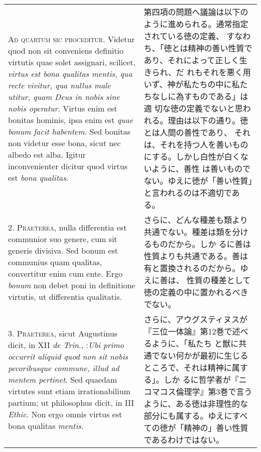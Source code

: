 \documentclass[10pt]{jsarticle}
\begin{document}
\begin{longtable}{p{21em}p{21em}}
{\scshape Ad quartum sic proceditur}. Videtur quod non sit conveniens
definitio virtutis quae solet assignari, scilicet, {\itshape virtus
est bona qualitas mentis, qua recte vivitur, qua nullus male utitur,
quam Deus in nobis sine nobis operatur}. Virtus enim est bonitas
hominis, ipsa enim est {\itshape quae bonum facit habentem}. Sed
bonitas non videtur esse bona, sicut nec albedo est alba. Igitur
inconvenienter dicitur quod virtus est {\itshape bona qualitas}.

&

第四項の問題へ議論は以下のように進められる。通常指定されている徳の定義、
すなわち、「徳とは精神の善い性質であり、それによって正しく生きられ、だ
れもそれを悪く用いず、神が私たちの中に私たちなしに為すものである」は適
切な徳の定義でないと思われる。理由は以下の通り。徳とは人間の善性であり、
それは、それを持つ人を善いものにする。しかし白性が白くないように、善性
は善いものでない。ゆえに徳が「善い性質」と言われるのは不適切である。

\\

2. {\scshape Praeterea}, nulla differentia est communior suo genere,
cum sit generis divisiva. Sed bonum est communius quam qualitas,
convertitur enim cum ente. Ergo {\itshape bonum} non debet poni in
definitione virtutis, ut differentia qualitatis.

&

さらに、どんな種差も類より共通でない。種差は類を分けるものだから。しか
るに善は性質よりも共通である。善は有と置換されるのだから。ゆえに善は、
性質の種差として徳の定義の中に置かれるべきでない。

\\

3. {\scshape Praeterea}, sicut Augustinus dicit, in XII {\itshape de
Trin}., :{\itshape Ubi primo occurrit aliquid quod non sit nobis
pecoribusque commune, illud ad mentem pertinet}. Sed quaedam virtutes
sunt etiam irrationabilium partium; ut philosophus dicit, in III
{\itshape Ethic}. Non ergo omnis virtus est bona qualitas {\itshape
mentis}.

&

さらに、アウグスティヌスが『三位一体論』第12巻で述べるように、「私たち
と獣に共通でない何かが最初に生じるところで、それは精神に属する」。しか
るに哲学者が『ニコマコス倫理学』第3巻で言うように、ある徳は非理性的な
部分にも属する。ゆえにすべての徳が「精神の」善い性質であるわけではない。

\\


\end{longtable}
\end{document}
